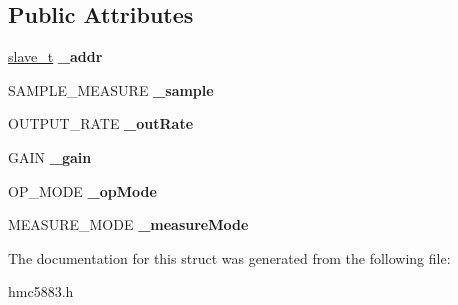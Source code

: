 \subsection*{Public Attributes}
\begin{DoxyCompactItemize}
\item 
\mbox{\label{structhmc5883__t_a78fcab12d61314413e2000223c8acc9b}} 
\mbox{\hyperlink{structslave__t}{slave\+\_\+t}} {\bfseries \+\_\+addr}
\item 
\mbox{\label{structhmc5883__t_a5d6bda3e7c498f9338bf60d4eb0676f1}} 
S\+A\+M\+P\+L\+E\+\_\+\+M\+E\+A\+S\+U\+RE {\bfseries \+\_\+sample}
\item 
\mbox{\label{structhmc5883__t_abdd992bb7c065497ba272dff4bd5b5fc}} 
O\+U\+T\+P\+U\+T\+\_\+\+R\+A\+TE {\bfseries \+\_\+out\+Rate}
\item 
\mbox{\label{structhmc5883__t_adafec64b6dd1f3fab546d3af997ccd0e}} 
G\+A\+IN {\bfseries \+\_\+gain}
\item 
\mbox{\label{structhmc5883__t_ae5ae94558f6f65fc5bfda7c3cd23c0da}} 
O\+P\+\_\+\+M\+O\+DE {\bfseries \+\_\+op\+Mode}
\item 
\mbox{\label{structhmc5883__t_ab81da8b66db5c81e2d5104b018cca68d}} 
M\+E\+A\+S\+U\+R\+E\+\_\+\+M\+O\+DE {\bfseries \+\_\+measure\+Mode}
\end{DoxyCompactItemize}


The documentation for this struct was generated from the following file\+:\begin{DoxyCompactItemize}
\item 
hmc5883.\+h\end{DoxyCompactItemize}

